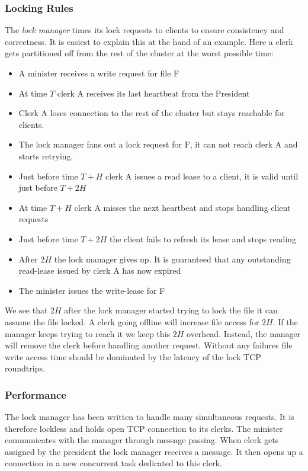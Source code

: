 \subsubsection*{Locking Rules}
The \textit{lock manager} times its lock requests to clients to ensure consistency and correctness. It is easiest to explain this at the hand of an example. Here a clerk gets partitioned off from the rest of the cluster at the worst possible time:
%
\begin{itemize}
	\item A minister receives a write request for file F
	\item At time $T$ clerk A receives its last heartbeat from the President
	\item Clerk A loses connection to the rest of the cluster but stays reachable for clients.
	\item The lock manager fans out a lock request for F, it can not reach clerk A and starts retrying.
	\item Just before time $T+H$ clerk A issues a read lease to a client, it is valid until just before $T+2H$
	\item At time $T+H$ clerk A misses the next heartbeat and stops handling client requests
	\item Just before time $T+2H$ the client fails to refresh its lease and stops reading
	\item After $2H$ the lock manager gives up. It is guaranteed that any outstanding read-lease issued by clerk A has now expired
	\item The minister issues the write-lease for F
\end{itemize}
%
We see that $2H$ after the lock manager started trying to lock the file it can assume the file locked. A clerk going offline will increase file access for $2H$. If the manager keeps trying to reach it we keep this $2H$ overhead. Instead, the manager will remove the clerk before handling another request. Without any failures file write access time should be dominated by the latency of the lock TCP roundtrips.
%
\subsubsection*{Performance}
The lock manager has been written to handle many simultaneous requests. It is therefore lockless and holds open TCP connection to its clerks. The minister communicates with the manager through message passing. When clerk gets assigned by the president the lock manager receives a message. It then opens up a connection in a new concurrent task dedicated to this clerk. 

